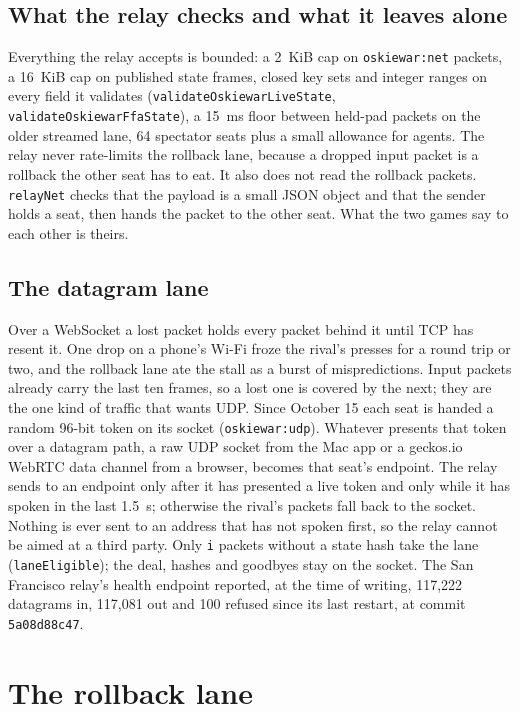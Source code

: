 \documentclass[10pt,letterpaper,twocolumn]{article}
\newcommand{\code}[1]{\texttt{\nolinkurl{#1}}}
\begin{document}
\subsection{What the relay checks and what it leaves alone}
Everything the relay accepts is bounded: a 2~KiB cap on \code{oskiewar:net} packets, a 16~KiB cap on published state frames, closed key sets and integer ranges on every field it validates (\code{validateOskiewarLiveState}, \code{validateOskiewarFfaState}), a 15~ms floor between held-pad packets on the older streamed lane, 64 spectator seats plus a small allowance for agents. The relay never rate-limits the rollback lane, because a dropped input packet is a rollback the other seat has to eat. It also does not read the rollback packets. \code{relayNet} checks that the payload is a small JSON object and that the sender holds a seat, then hands the packet to the other seat. What the two games say to each other is theirs.

\subsection{The datagram lane}
Over a WebSocket a lost packet holds every packet behind it until TCP has resent it. One drop on a phone's Wi-Fi froze the rival's presses for a round trip or two, and the rollback lane ate the stall as a burst of mispredictions. Input packets already carry the last ten frames, so a lost one is covered by the next; they are the one kind of traffic that wants UDP. Since October 15 each seat is handed a random 96-bit token on its socket (\code{oskiewar:udp}). Whatever presents that token over a datagram path, a raw UDP socket from the Mac app or a geckos.io WebRTC data channel from a browser, becomes that seat's endpoint. The relay sends to an endpoint only after it has presented a live token and only while it has spoken in the last 1.5~s; otherwise the rival's packets fall back to the socket. Nothing is ever sent to an address that has not spoken first, so the relay cannot be aimed at a third party. Only \code{i} packets without a state hash take the lane (\code{laneEligible}); the deal, hashes and goodbyes stay on the socket. The San Francisco relay's health endpoint reported, at the time of writing, 117,222 datagrams in, 117,081 out and 100 refused since its last restart, at commit \code{5a08d88c47}.

\section{The rollback lane}\label{sec:rollback}
\end{document}
